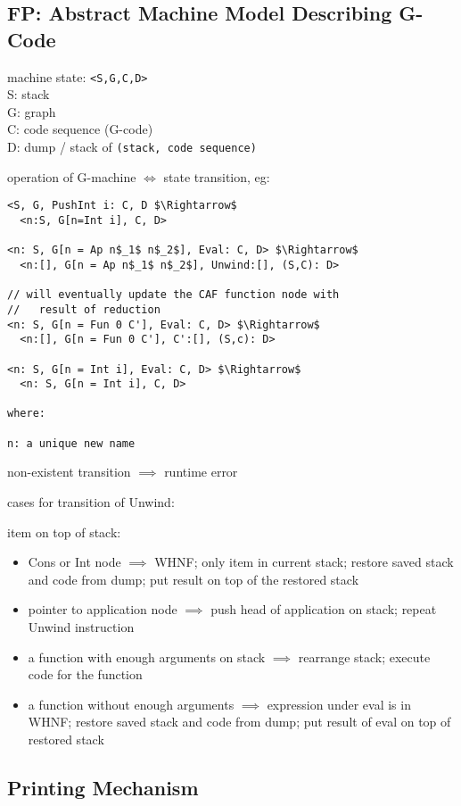 \documentclass[8pt]{extarticle}
\begin{document}
\begin{multicols*}{2}
\vfill\null
\columnbreak

\section{FP: Abstract Machine Model Describing G-Code}

machine state: \verb|<S,G,C,D>|\\
S: stack\\
G: graph\\
C: code sequence (G-code)\\
D: dump / stack of \verb|(stack, code sequence)|

operation of G-machine $\iff$ state transition, eg:

\begin{lstlisting}
<S, G, PushInt i: C, D $\Rightarrow$
  <n:S, G[n=Int i], C, D>

<n: S, G[n = Ap n$_1$ n$_2$], Eval: C, D> $\Rightarrow$
  <n:[], G[n = Ap n$_1$ n$_2$], Unwind:[], (S,C): D>

// will eventually update the CAF function node with
//   result of reduction
<n: S, G[n = Fun 0 C'], Eval: C, D> $\Rightarrow$
  <n:[], G[n = Fun 0 C'], C':[], (S,c): D>

<n: S, G[n = Int i], Eval: C, D> $\Rightarrow$
  <n: S, G[n = Int i], C, D>

where:

n: a unique new name
\end{lstlisting}

non-existent transition $\implies$ runtime error

cases for transition of Unwind:

item on top of stack:
\begin{itemize}
\item Cons or Int node $\implies$ WHNF; only item in current stack; restore saved stack and code from dump; put result on top of the restored stack
\item pointer to application node $\implies$ push head of application on stack; repeat Unwind instruction
\item a function with enough arguments on stack $\implies$ rearrange stack; execute code for the function
\item a function without enough arguments $\implies$ expression under eval is in WHNF; restore saved stack and code from dump; put result of eval on top of restored stack
\end{itemize}

\subsection{Printing Mechanism}


\end{multicols*}
\end{document}
